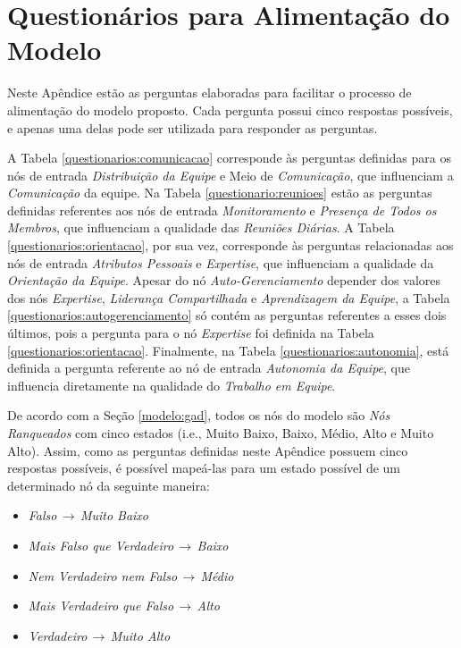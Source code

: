 \chapter{Questionários para Alimentação do Modelo}
\label{questionarios}

Neste Apêndice estão as perguntas elaboradas para facilitar o processo de alimentação do modelo proposto. Cada pergunta possui cinco respostas possíveis, e apenas uma delas pode ser utilizada para responder as perguntas.

A Tabela \ref{questionarios:comunicacao} corresponde às perguntas definidas para os nós de entrada \textit{Distribuição da Equipe} e Meio de \textit{Comunicação}, que influenciam a \textit{Comunicação} da equipe. Na Tabela \ref{questionario:reunioes} estão as perguntas definidas referentes aos nós de entrada \textit{Monitoramento} e \textit{Presença de Todos os Membros}, que influenciam a qualidade das \textit{Reuniões Diárias}. A Tabela \ref{questionarios:orientacao}, por sua vez, corresponde às perguntas relacionadas aos nós de entrada \textit{Atributos Pessoais} e \textit{Expertise}, que influenciam a qualidade da \textit{Orientação da Equipe}. Apesar do nó \textit{Auto-Gerenciamento} depender dos valores dos nós \textit{Expertise}, \textit{Liderança Compartilhada} e \textit{Aprendizagem da Equipe}, a Tabela \ref{questionarios:autogerenciamento} só contém as perguntas referentes a esses dois últimos, pois a pergunta para o nó \textit{Expertise} foi definida na Tabela \ref{questionarios:orientacao}. Finalmente, na Tabela \ref{questionarios:autonomia}, está definida a pergunta referente ao nó de entrada \textit{Autonomia da Equipe}, que influencia diretamente na qualidade do \textit{Trabalho em Equipe}.

De acordo com a Seção \ref{modelo:gad}, todos os nós do modelo são \textit{Nós Ranqueados} com cinco estados (i.e., Muito Baixo, Baixo, Médio, Alto e Muito Alto). Assim, como as perguntas definidas neste Apêndice possuem cinco respostas possíveis, é possível mapeá-las para um estado possível de um determinado nó da seguinte maneira:

\begin{itemize}
  \item \textit{Falso}$\,\to\,$\textit{Muito Baixo}
  \item \textit{Mais Falso que Verdadeiro}$\,\to\,$\textit{Baixo}
  \item \textit{Nem Verdadeiro nem Falso}$\,\to\,$\textit{Médio}
  \item \textit{Mais Verdadeiro que Falso}$\,\to\,$\textit{Alto}
  \item \textit{Verdadeiro}$\,\to\,$\textit{Muito Alto}
\end{itemize}

